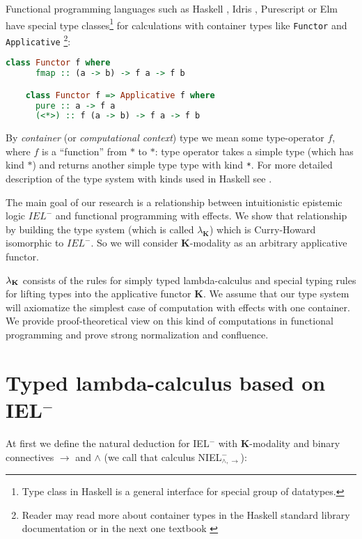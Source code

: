 \documentclass[a4paper]{article}
\begin{document}
  Functional programming languages such as Haskell \cite{Haskell}, Idris \cite{Idris}, Purescript \cite{Purs}
  or Elm \cite{Elm} have special type classes\footnote{Type class in Haskell is a general interface for
  special group of datatypes.} for calculations with container types like \verb"Functor" and
  \verb"Applicative" \footnote{Reader may read more about container types in the Haskell standard library documentation\cite{Base} or in the next one textbook
  \cite{Miran}}:

  \begin{lstlisting}[language=Haskell]
    class Functor f where
      fmap :: (a -> b) -> f a -> f b

    class Functor f => Applicative f where
      pure :: a -> f a
      (<*>) :: f (a -> b) -> f a -> f b
  \end{lstlisting}

  By \emph{container} (or \emph{computational context}) type we mean some type-operator $f$, where $f$ is a
  ``function'' from $*$ to $*$: type operator takes a simple type (which has kind $*$) and returns another
  simple type type with kind \verb"*". For more detailed description of the type system with kinds used in
  Haskell see \cite{Morten}.


  The main goal of our research is a relationship between intuitionistic epistemic logic $IEL^{-}$ and
  functional programming with effects. We show that relationship by building the type system (which is called $\lambda_{\textbf{K}}$) which is Curry-Howard isomorphic to $IEL^{-}$. So we will consider $\textbf{K}$-modality as an arbitrary applicative functor.

  $\lambda_{{\bf K}}$ consists of the rules for simply typed lambda-calculus and special typing rules for
  lifting types into the applicative functor $\textbf{K}$. We assume that our type system will
  axiomatize the simplest case of computation with effects with one container. We provide proof-theoretical
  view on
  this kind of computations in functional programming and prove strong normalization and confluence.

  \section{Typed lambda-calculus based on IEL$^{-}$}

  At first we define the natural deduction for IEL$^{-}$ with $\textbf{K}$-modality and binary connectives
  $\to$ and $\land$ (we call that calculus NIEL$^{-}_{\land, \to}$):
\end{document}
